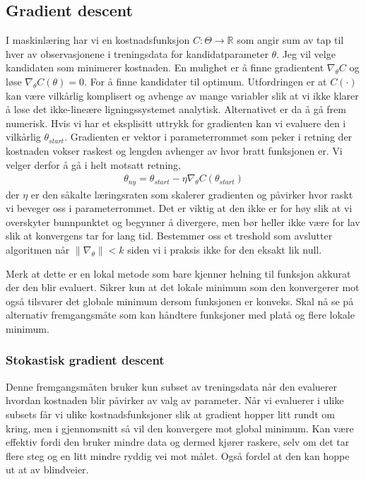 \subsection{Gradient descent}
I maskinlæring har vi en kostnadsfunksjon $C:\Theta \to \mathbb{R}$ som angir sum av tap til hver av observasjonene i treningsdata for kandidatparameter $\theta$. Jeg vil velge kandidaten som minimerer kostnaden. En mulighet er å finne gradientent $\nabla_{\theta}C$ og løse $\nabla_{\theta}C(\theta)=0$. For å finne kandidater til optimum. Utfordringen er at $C(\cdot)$ kan være vilkårlig komplisert og avhenge av mange variabler slik at vi ikke klarer å løse det ikke-lineære ligningssystemet analytisk. Alternativet er da å gå frem numerisk. Hvis vi har et eksplisitt uttrykk for gradienten kan vi evaluere den i vilkårlig $\theta_{start}$. Gradienten er vektor i parameterrommet som peker i retning der kostnaden vokser raskest og lengden avhenger av hvor bratt funksjonen er. Vi velger derfor å gå i helt motsatt retning,
\begin{align}
\theta_{ny} = \theta_{start}-\eta\nabla_{\theta}C(\theta_{start})
\end{align}
der $\eta$ er den såkalte læringsraten som skalerer gradienten og påvirker hvor raskt vi beveger oss i parameterrommet. Det er viktig at den ikke er for høy slik at vi overskyter bunnpunktet og begynner å divergere, men bør heller ikke være for lav slik at konvergens tar for lang tid. Bestemmer oss et treshold som avslutter algoritmen når $\lVert \nabla_{\theta} \rVert <k$ siden vi i praksis ikke for den eksakt lik null. 

Merk at dette er en lokal metode som bare kjenner helning til funksjon akkurat der den blir evaluert. Sikrer kun at det lokale minimum som den konvergerer mot også tilsvarer det globale minimum dersom funksjonen er konveks. Skal nå se på alternativ fremgangsmåte som kan håndtere funksjoner med platå og flere lokale minimum.
\subsubsection{Stokastisk gradient descent}
Denne fremgangsmåten bruker kun subset av treningsdata når den evaluerer hvordan kostnaden blir påvirker av valg av parameter. Når vi evaluerer i ulike subsets får vi ulike kostnadsfunksjoner slik at gradient hopper litt rundt om kring, men i gjennomsnitt så vil den konvergere mot global minimum. Kan være effektiv fordi den bruker mindre data og dermed kjører raskere, selv om det tar flere steg og en litt mindre ryddig vei mot målet. Også fordel at den kan hoppe ut at av blindveier.
